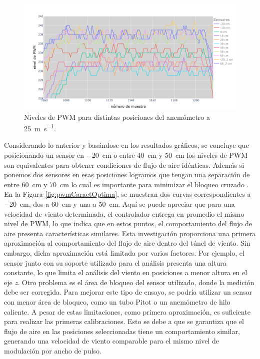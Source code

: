 \begin{figure}[H]
    \centering
    \includegraphics[width=\linewidth]{Figuras/resultados/caracterizacion/pwmCaract25.png}
    \caption{Niveles de PWM para distintas posiciones del anemómetro a \SI{25}{\meter\per\second}.}
    \label{fig:pwmCaract25}
\end{figure}
Considerando lo anterior y basándose en los resultados gráficos, se concluye que posicionando un sensor en \SI{-20}{\centi\meter} o entre \SI{40}{\centi\meter} y \SI{50}{\centi\meter} los niveles de PWM son equivalentes para obtener condiciones de flujo de aire idénticas. Además si ponemos dos sensores en esas posiciones logramos que tengan una separación de entre \SI{60}{\centi\meter} y \SI{70}{\centi\meter} lo cual es importante para minimizar el bloqueo cruzado \cite{IEC61400-12-1} \cite{ISO16622}. En la Figura \ref{fig:pwmCaractOptima}, se muestran dos curvas correspondientes a \SI{-20}{\centi\meter}, dos a \SI{60}{\centi\meter} y una a \SI{50}{\centi\meter}. Aquí se puede apreciar que para una velocidad de viento determinada, el controlador entrega en promedio el mismo nivel de PWM, lo que indica que en estos puntos, el comportamiento del flujo de aire presenta características similares. Esta investigación proporciona una primera aproximación al comportamiento del flujo de aire dentro del túnel de viento. Sin embargo, dicha aproximación está limitada por varios factores. Por ejemplo, el sensor junto con su soporte utilizado para el análisis presenta una altura constante, lo que limita el análisis del viento en posiciones a menor altura en el eje \textit{z}. Otro problema es el área de bloqueo del sensor utilizado, donde la medición debe ser corregida. Para mejorar este tipo de ensayo, se podría utilizar un sensor con menor área de bloqueo, como un tubo Pitot o un anemómetro de hilo caliente. A pesar de estas limitaciones, como primera aproximación, es suficiente para realizar las primeras calibraciones. Esto se debe a que se garantiza que el flujo de aire en las posiciones seleccionadas tiene un comportamiento similar, generando una velocidad de viento comparable para el mismo nivel de modulación por ancho de pulso.

